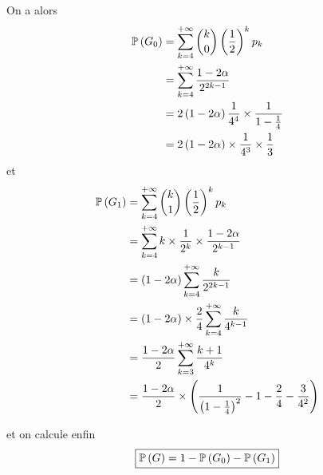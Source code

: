 \begin{solution}
\begin{enumerate}
        On a alors 
        \begin{align}
            \P\left(G_{0}\right)
            &=\sum_{k=4}^{+\infty}\binom{k}{0}\left(\frac{1}{2}\right)^{k}p_{k}\\
            &=\sum_{k=4}^{+\infty}\frac{1-2\alpha}{2^{2k-1}}\\
            &=2\left(1-2\alpha\right)\frac{1}{4^{4}}\times\frac{1}{1-\frac{1}{4}}\\
            &=2\left(1-2\alpha\right)\times\frac{1}{4^{3}}\times\frac{1}{3}
        \end{align}
        et 
        \begin{align}
            \P\left(G_{1}\right)
            &=\sum_{k=4}^{+\infty}\binom{k}{1}\left(\frac{1}{2}\right)^{k}p_{k}\\
            &=\sum_{k=4}^{+\infty}k\times\frac{1}{2^{k}}\times\frac{1-2\alpha}{2^{k-1}}\\
            &=\left(1-2\alpha\right)\sum_{k=4}^{+\infty}\frac{k}{2^{2k-1}}\\
            &=\left(1-2\alpha\right)\times\frac{2}{4}\sum_{k=4}^{+\infty}\frac{k}{4^{k-1}}\\
            &=\frac{1-2\alpha}{2}\sum_{k=3}^{+\infty}\frac{k+1}{4^{k}}\\
            &=\frac{1-2\alpha}{2}\times\left(\frac{1}{\left(1-\frac{1}{4}\right)^{2}}-1-\frac{2}{4}-\frac{3}{4^{2}}\right)
        \end{align}

        et on calcule enfin 
        \begin{equation}
            \boxed{\P\left(G\right)=1-\P\left(G_{0}\right)-\P\left(G_{1}\right)}
        \end{equation}
    \end{enumerate}
\end{solution}


